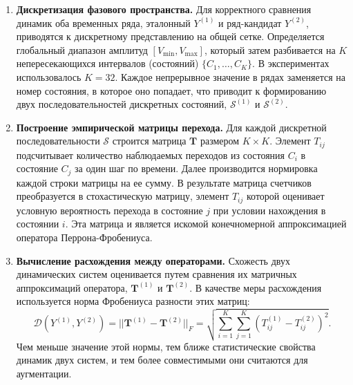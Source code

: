\documentclass[a4paper,12pt]{extarticle}
\begin{document}
\begin{enumerate}
    \item \textbf{Дискретизация фазового пространства.} Для корректного сравнения динамик оба временных ряда, эталонный $Y^{(1)}$ и ряд-кандидат $Y^{(2)}$, приводятся к дискретному представлению на общей сетке. Определяется глобальный диапазон амплитуд $[V_{\min}, V_{\max}]$, который затем разбивается на $K$ непересекающихся интервалов (состояний) $\{C_1, \dots, C_K\}$. В экспериментах использовалось $K=32$. Каждое непрерывное значение в рядах заменяется на номер состояния, в которое оно попадает, что приводит к формированию двух последовательностей дискретных состояний, $\mathcal{S}^{(1)}$ и $\mathcal{S}^{(2)}$.

    \item \textbf{Построение эмпирической матрицы перехода.} Для каждой дискретной последовательности $\mathcal{S}$ строится матрица $\mathbf{T}$ размером $K \times K$. Элемент $T_{ij}$ подсчитывает количество наблюдаемых переходов из состояния $C_i$ в состояние $C_j$ за один шаг по времени. Далее производится нормировка каждой строки матрицы на ее сумму. В результате матрица счетчиков преобразуется в стохастическую матрицу, элемент $T_{ij}$ которой оценивает условную вероятность перехода в состояние $j$ при условии нахождения в состоянии $i$. Эта матрица и является искомой конечномерной аппроксимацией оператора Перрона-Фробениуса.

    \item \textbf{Вычисление расхождения между операторами.} Схожесть двух динамических систем оценивается путем сравнения их матричных аппроксимаций оператора, $\mathbf{T}^{(1)}$ и $\mathbf{T}^{(2)}$. В качестве меры расхождения используется норма Фробениуса разности этих матриц:
    \[
    \mathcal{D}(Y^{(1)}, Y^{(2)}) = ||\mathbf{T}^{(1)} - \mathbf{T}^{(2)}||_F = \sqrt{\sum_{i=1}^{K}\sum_{j=1}^{K} (T_{ij}^{(1)} - T_{ij}^{(2)})^2}.
    \]
    Чем меньше значение этой нормы, тем ближе статистические свойства динамик двух систем, и тем более совместимыми они считаются для аугментации.
\end{enumerate}
\end{document}
